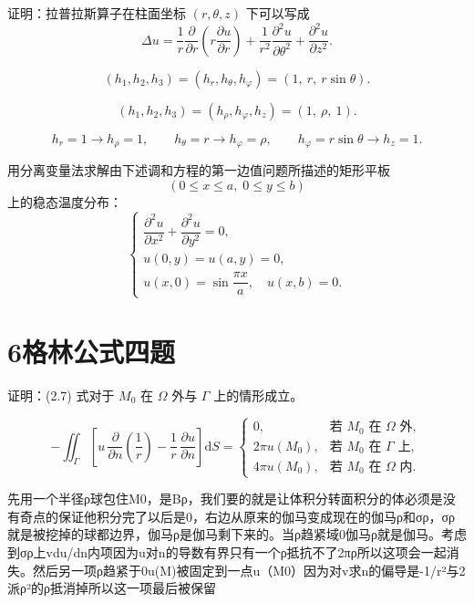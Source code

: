 \begin{homework}[3]
证明：拉普拉斯算子在柱面坐标 $(r,\theta,z)$ 下可以写成
\[
\Delta u
=\frac1r\frac{\partial}{\partial r}\!\left(r\frac{\partial u}{\partial r}\right)
+\frac1{r^2}\frac{\partial^2 u}{\partial\theta^2}
+\frac{\partial^2 u}{\partial z^2}.
\]
\end{homework}
\begin{dxtips}
    $$(h_1,h_2,h_3)=(h_r,h_\theta,h_\varphi)=(1,\ r,\ r\sin\theta).$$

$$(h_1,h_2,h_3)=(h_\rho,h_\varphi,h_z)=(1,\ \rho,\ 1).$$

$$h_r=1\to h_\rho=1,\qquad h_\theta=r\to h_\varphi=\rho,\qquad h_\varphi=r\sin\theta\to h_z=1.$$
\end{dxtips}

\begin{homework}[6]
用分离变量法求解由下述调和方程的第一边值问题所描述的矩形平板
\[
(0\le x\le a,\;0\le y\le b)
\]
上的稳态温度分布：
\[
\begin{cases}
\dfrac{\partial^2 u}{\partial x^2}
+\dfrac{\partial^2 u}{\partial y^2}=0,\\[0.6em]
u(0,y)=u(a,y)=0,\\[0.4em]
u(x,0)=\sin\dfrac{\pi x}{a},\quad u(x,b)=0.
\end{cases}
\]
\end{homework}


\section{6格林公式四题}
\begin{homework}[1]
证明：(2.7) 式对于 $M_0$ 在 $\Omega$ 外与 $\Gamma$ 上的情形成立。
\end{homework}
\begin{equation}\tag{2.7}\label{eq:2.7}
 - \iint_{\Gamma}
 \left[
   u\,\frac{\partial}{\partial n}\!\left(\frac{1}{r}\right)
   - \frac{1}{r}\,\frac{\partial u}{\partial n}
 \right]\mathrm{d}S
 =
 \begin{cases}
   0, & \text{若 } M_0 \text{ 在 } \Omega \text{ 外},\\[4pt]
   2\pi u(M_0), & \text{若 } M_0 \text{ 在 } \Gamma \text{ 上},\\[4pt]
   4\pi u(M_0), & \text{若 } M_0 \text{ 在 } \Omega \text{ 内}.
 \end{cases}
\end{equation}
\begin{dxtips}
    先用一个半径ρ球包住M0，是Bρ，我们要的就是让体积分转面积分的体必须是没有奇点的保证他积分完了以后是0，右边从原来的伽马变成现在的伽马ρ和σρ，σρ就是被挖掉的球都边界，伽马ρ是伽马剩下来的。当ρ趋紧域0伽马ρ就是伽马。考虑到σρ上vdu/dn内项因为u对n的导数有界只有一个ρ抵抗不了2πρ所以这项会一起消失。然后另一项ρ趋紧于0u(M)被固定到一点u（M0）因为对v求n的偏导是-1/r²与2派ρ²的ρ抵消掉所以这一项最后被保留
\end{dxtips}


